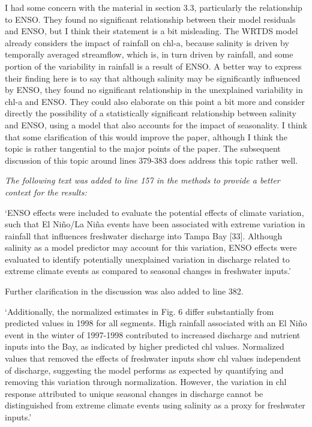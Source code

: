 \documentclass[letterpaper,12pt,oneside]{article}\usepackage[]{graphicx}\usepackage[]{color}
\begin{document}
I had some concern with the material in section 3.3, particularly the relationship to ENSO.  They found no significant relationship between their model residuals and ENSO, but I think their statement is a bit misleading.  The WRTDS model already considers the impact of rainfall on chl-a, because salinity is driven by temporally averaged streamflow, which is, in turn driven by rainfall, and some portion of the variability in rainfall is a result of ENSO.  A better way to express their finding here is to say that although salinity may be significantly influenced by ENSO, they found no significant relationship in the unexplained variability in chl-a and ENSO.  They could also elaborate on this point a bit more and consider directly the possibility of a statistically significant relationship between salinity and ENSO, using a model that also accounts for the impact of seasonality.  I think that some clarification of this would improve the paper, although I think the topic is rather tangential to the major points of the paper.  The subsequent discussion of this topic around lines 379-383 does address this topic rather well.

{\it The following text was added to line 157 in the methods to provide a better context for the results:

`ENSO effects were included to evaluate the potential effects of climate variation, such that El Ni\~{n}o/La Ni\~{n}a events have been associated with extreme variation in rainfall that influences freshwater discharge into Tampa Bay [33].  Although salinity as a model predictor may account for this variation, ENSO effects were evaluated to identify potentially unexplained variation in discharge related to extreme climate events as compared to seasonal changes in freshwater inputs.'

Further clarification in the discussion was also added to line 382.

`Additionally, the normalized  estimates in Fig. 6 differ substantially from predicted values in 1998 for all segments.  High rainfall associated with an El Ni\~{n}o event in the winter of 1997-1998 contributed to increased discharge and nutrient inputs into the Bay, as indicated by higher predicted \ac{chl} values.  Normalized values that removed the effects of freshwater inputs show \ac{chl} values independent of discharge, suggesting the model performs as expected by quantifying and removing this variation through normalization.  However, the variation in \ac{chl} response attributed to unique seasonal changes in discharge cannot be distinguished from extreme climate events using salinity as a proxy for freshwater inputs.'
}
\end{document}
